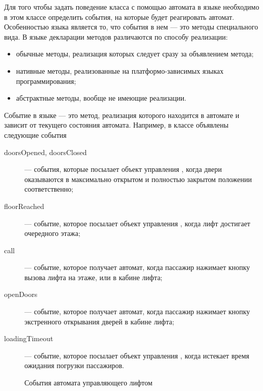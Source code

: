 Для того чтобы задать поведение класса с помощью автомата в языке  необходимо в этом классе определить
события, на которые будет реагировать автомат. Особенностью языка  является то, что события в нем --- это
методы специального вида. В языке  декларации методов различаются по способу реализации:
\begin{itemize}
 \item обычные методы, реализация которых следует сразу за объявлением метода;
 \item нативные методы, реализованные на платформо-зависимых языках программирования;
 \item абстрактные методы, вообще не имеющие реализации.
\end{itemize}
Событие в языке  --- это метод, реализация которого находится в автомате и зависит от текущего состояния
автомата. Например, в классе  объявлены следующие события \pic{\ref{fig:ElevatorEvents}}
\begin{description}
 \item[doorsOpened, doorsClosed] --- события, которые посылает объект управления , когда двери оказываются в максимально открытом и полностью закрытом положении соответственно;
 \item[floorReached] --- событие, которое посылает объект управления , когда лифт достигает очередного этажа;
 \item[call] --- событие, которое получает автомат, когда пассажир нажимает кнопку вызова лифта на этаже, или в кабине лифта;
 \item[openDoors] --- событие, которое получает автомат, когда пассажир нажимает кнопку экстренного открывания дверей в кабине лифта;
 \item[loadingTimeout] --- событие, которое посылает объект управления , когда истекает время ожидания погрузки пассажиров.
\end{description}
\begin{figure}
 \centering
 \caption{События автомата управляющего лифтом}
 \label{fig:ElevatorEvents}
\end{figure}
